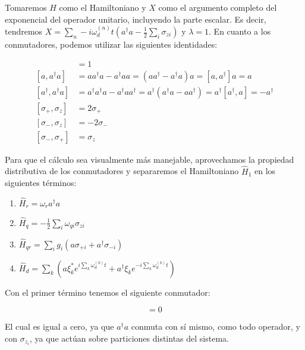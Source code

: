 Tomaremos $H$ como el Hamiltoniano y $X$ como el argumento completo del exponencial del operador unitario, incluyendo la parte escalar. Es decir, tendremos $X = \sum\limits_n-i \omega_d^{(n)} t(a^\dagger a - \frac{1}{2} \sum\limits_i \sigma_{z i})$ y $\lambda = 1$. En cuanto a los conmutadores, podemos utilizar las siguientes identidades:

\begin{align}
    [a, a^\dagger] &= 1
    \label{eq:a_ad} \\
    [a, a^\dagger a] &= a a^\dagger a - a^\dagger a a = (a a^\dagger - a^\dagger a) a = [a, a^\dagger] a = a
    \label{eq:a_ada} \\
    [a^\dagger, a^\dagger a] &= a^\dagger a^\dagger a - a^\dagger a a^\dagger = a^\dagger (a^\dagger a - a a^\dagger) = a^\dagger [a^\dagger, a] = -a^\dagger
    \label{eq:ad_ada} \\
    [\sigma_+, \sigma_z] &= 2 \sigma_+
    \label{eq:sp_sz} \\
    [\sigma_-, \sigma_z] &= - 2 \sigma_-
    \label{eq:sm_sz} \\
    [\sigma_-, \sigma_+] &= \sigma_z
    \label{eq:sm_sp}
\end{align}

Para que el cálculo sea visualmente más manejable, aprovechamos la propiedad distributiva de los conmutadores y separaremos el Hamiltoniano $\hat{H}_1$ en los siguientes términos:

\begin{enumerate}
    \item $\hat{H}_r = \omega_r a^\dag a$
    \item $\hat{H}_q = - \frac{1}{2} \sum\limits_i \omega_{qi} \sigma_{zi}$
    \item $\hat{H}_{qr} = \sum\limits_i g_i (a \sigma_{+ i} + a^\dagger \sigma_{- i})$
    \item $\hat{H}_d = \sum\limits_k (a\xi_k^*e^{i\sum\limits_k \omega_d^{(k)}t}+ a^\dagger\xi_ke^{-i\sum\limits_k \omega_d^{(k)}t})$
\end{enumerate}


Con el primer término tenemos el siguiente conmutador:

\begin{equation}
    [\omega_r a^\dag a, X] = 0
\end{equation}

El cual es igual a cero, ya que $a^\dagger a$ conmuta con sí mismo, como todo operador, y con $\sigma_{z_i}$, ya que actúan sobre particiones distintas del sistema.

